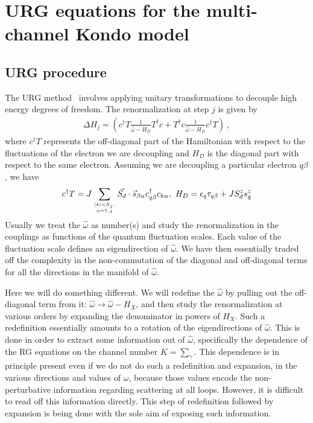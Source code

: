 \documentclass[12pt]{revtex4-2}
\begin{document}
\section{URG equations for the multi-channel Kondo model}

\subsection{URG procedure}
The URG method~\cite{anirbanurg1,anirbanurg2,anirbanmott1,anirbanmott2,siddharthacpi,santanukagome} involves applying unitary transformations to decouple high energy degrees of freedom. The renormalization at step \(j\) is given by
\begin{align}
	\Delta H_j = \left(c^\dagger T \frac{1}{\hat \omega - H_D}T^\dagger c + T^\dagger c \frac{1}{\hat \omega - H_D}c^\dagger T\right)~,
\end{align}
where \(c^\dagger T\) represents the off-diagonal part of the Hamiltonian with respect to the fluctuations of the electron we are decoupling and \(H_D\) is the diagonal part with respect to the same electron. Assuming we are decoupling a particular electron \(q\beta\), we have
\begin{align}
	c^\dagger T = J \sum_{|k| < \Lambda_j, \atop{\alpha=\uparrow,\downarrow}}\vec{S_d}\cdot\vec{s}_{\beta \alpha}c^\dagger_{q\beta}c_{k\alpha}, ~H_D = \epsilon_q \tau_{q\beta} + J S_d^z s_q^z
\end{align}
Usually we treat the \(\hat \omega\) as number(s) and study the renormalization in the couplings as functions of the quantum fluctuation scales. Each value of the fluctuation scale defines an eigendirection of \(\hat \omega\). We have then essentially traded off the complexity in the non-commutation of the diagonal and off-diagonal terms for all the directions in the manifold of \(\hat \omega\).

Here we will do something different. We will redefine the \(\hat \omega\) by pulling out the off-diagonal term from it: \(\hat \omega \to \hat \omega - H_X\), and then study the renormalization at various orders by expanding the denominator in powers of \(H_X\). Such a redefinition essentially amounts to a rotation of the eigendirections of \(\hat \omega\). This is done in order to extract some information out of \(\hat \omega\), specifically the dependence of the RG equations on the channel number \(K = \sum_\gamma\). This dependence is in principle present even if we do not do such a redefinition and expansion, in the various directions and values of \(\omega\), because those values encode the non-perturbative information regarding scattering at all loops. However, it is difficult to read off this information directly. This step of redefinition followed by expansion is being done with the sole aim of exposing such information. 
\end{document}
